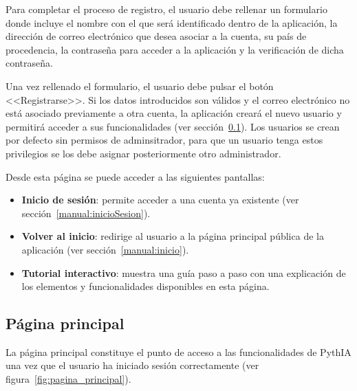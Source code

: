 Para completar el proceso de registro, el usuario debe rellenar un formulario donde incluye el nombre con el que será identificado dentro de la aplicación, la dirección de correo electrónico que desea asociar a la cuenta, su país de procedencia, la contraseña para acceder a la aplicación y la verificación de dicha contraseña.

Una vez rellenado el formulario, el usuario debe pulsar el botón <<Registrarse>>. Si los datos introducidos son válidos y el correo electrónico no está asociado previamente a otra cuenta, la aplicación creará el nuevo usuario y permitirá acceder a sus funcionalidades (ver sección~\ref{manual:pagPrincipal}). Los usuarios se crean por defecto sin permisos de adminsitrador, para que un usuario tenga estos privilegios se los debe asignar posteriormente otro administrador.

Desde esta página se puede acceder a las siguientes pantallas:
\begin{itemize}
    \item \textbf{Inicio de sesión}: permite acceder a una cuenta ya existente (ver sección~\ref{manual:inicioSesion}).
    \item \textbf{Volver al inicio}: redirige al usuario a la página principal pública de la aplicación (ver sección~\ref{manual:inicio}).
    \item \textbf{Tutorial interactivo}: muestra una guía paso a paso con una explicación de los elementos y funcionalidades disponibles en esta página.
\end{itemize}

\subsection{Página principal}
\label{manual:pagPrincipal}

La página principal constituye el punto de acceso a las funcionalidades de PythIA una vez que el usuario ha iniciado sesión correctamente (ver figura~\ref{fig:pagina_principal}).

